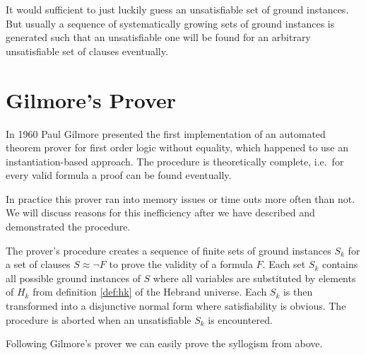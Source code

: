 It would sufficient to just luckily guess an unsatisfiable set of ground instances. 
But usually a sequence of systematically growing sets of ground instances is generated 
such that an unsatisfiable one will be found 
for an arbitrary unsatisfiable set of clauses
eventually.



%
%
%
%
%




\section{Gilmore's Prover}

In 1960 Paul Gilmore presented the first {\myem implementation} of an automated 
theorem prover \cite{5392528} for first order logic without equality,
which happened to use an instantiation-based approach. 
The procedure is theoretically complete, i.e.~for every valid formula 
a proof can be found eventually.

In practice this prover ran into memory issues or time outs more often than not.
We will discuss reasons for this inefficiency after we have described and demonstrated the procedure.

The prover's procedure 
creates a sequence of finite sets of ground instances $S_k$ 
for a set of clauses $S\approx\lnot F$ to prove the validity of a formula $F$.
Each set $S_k$ contains all possible ground instances of $S$ 
where all variables are substituted by elements of $H_k$
from definition \ref{def:hk} of the Hebrand universe.
Each $S_k$ is then transformed into a disjunctive normal form where satisfiability is obvious.
The procedure is aborted when an unsatisfiable $S_k$ is encountered.

Following Gilmore's prover we can easily prove the syllogism from above.

